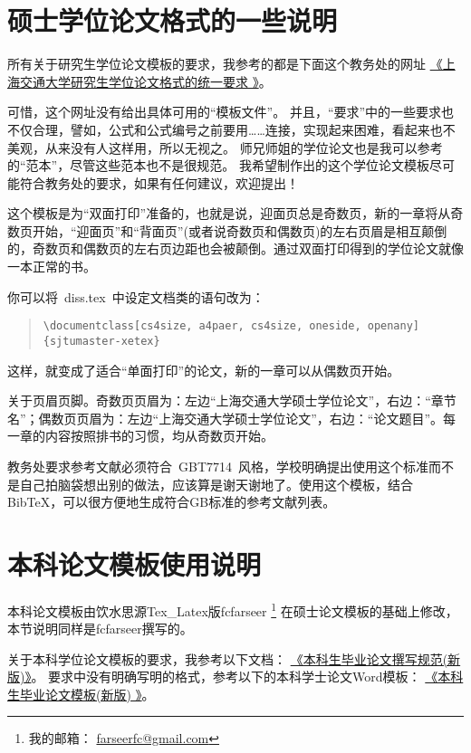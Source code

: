 \section{硕士学位论文格式的一些说明}
\label{sec:thesisformat}

所有关于研究生学位论文模板的要求，我参考的都是下面这个教务处的网址
\href{http://www.gs.sjtu.edu.cn/policy/fileShow.ahtml?id=130}{《上海交通大学研究生学位论文格式的统一要求 》}。

可惜，这个网址没有给出具体可用的“模板文件”。
并且，``要求''中的一些要求也不仅合理，譬如，公式和公式编号之前要用……连接，实现起来困难，看起来也不美观，从来没有人这样用，所以无视之。
师兄师姐的学位论文也是我可以参考的“范本”，尽管这些范本也不是很规范。
我希望制作出的这个学位论文模板尽可能符合教务处的要求，如果有任何建议，欢迎提出！

这个模板是为``双面打印''准备的，也就是说，迎面页总是奇数页，新的一章将从奇数页开始，``迎面页''和``背面页''(或者说奇数页和偶数页)的左右页眉是相互颠倒的，奇数页和偶数页的左右页边距也会被颠倒。通过双面打印得到的学位论文就像一本正常的书。

你可以将~diss.tex~中设定文档类的语句改为：

\begin{quote}
  {\scriptsize\verb+\documentclass[cs4size, a4paer, cs4size, oneside, openany]{sjtumaster-xetex}+}
\end{quote}

这样，就变成了适合“单面打印”的论文，新的一章可以从偶数页开始。

关于页眉页脚。奇数页页眉为：左边``上海交通大学硕士学位论文''，右边：``章节名''；偶数页页眉为：左边``上海交通大学硕士学位论文''，右边：``论文题目''。每一章的内容按照排书的习惯，均从奇数页开始。

教务处要求参考文献必须符合~GBT7714~风格，学校明确提出使用这个标准而不是自己拍脑袋想出别的做法，应该算是谢天谢地了。使用这个模板，结合BibTeX，可以很方便地生成符合GB标准的参考文献列表。

\section{本科论文模板使用说明}
\label{sec:bachelor}

本科论文模板由饮水思源Tex\_Latex版fcfarseer
\footnote{我的邮箱： \href{mailto:farseerfc@gmail.com}{farseerfc@gmail.com} }
在硕士论文模板的基础上修改，本节说明同样是fcfarseer撰写的。

关于本科学位论文模板的要求，我参考以下文档：
\href{http://jwc.sjtu.edu.cn/dispTable.asp?tab=softdown&id=178}{《本科生毕业论文撰写规范(新版)》}。
要求中没有明确写明的格式，参考以下的本科学士论文Word模板：
\href{http://www.jwc.sjtu.edu.cn/dispTable.asp?tab=softdown&id=179}{《本科生毕业论文模板(新版) 》}。

